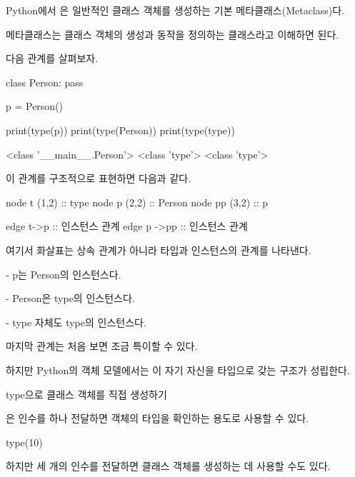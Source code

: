 Python에서 은 일반적인 클래스 객체를 생성하는 기본 메타클래스(Metaclass)다.

메타클래스는 클래스 객체의 생성과 동작을 정의하는 클래스라고 이해하면 된다.

다음 관계를 살펴보자.

\begin{dhkcode}
class Person:
    pass

p = Person()

print(type(p))
print(type(Person))
print(type(type))
\end{dhkcode}

\begin{dhkzsh}
<class '__main__.Person'>
<class 'type'>
<class 'type'>
\end{dhkzsh}

이 관계를 구조적으로 표현하면 다음과 같다.

\begin{dhkdiagram}[in=12]
node t (1,2) :: type
node p (2,2) :: Person
node pp (3,2) :: p

edge t->p :: 인스턴스 관계
edge p ->pp :: 인스턴스 관계
\end{dhkdiagram}

여기서 화살표는 상속 관계가 아니라 타입과 인스턴스의 관계를 나타낸다.

\begin{dhksmry}
    - p는 Person의 인스턴스다.

    - Person은 type의 인스턴스다.

    - type 자체도 type의 인스턴스다.
\end{dhksmry}

마지막 관계는 처음 보면 조금 특이할 수 있다.

하지만 Python의 객체 모델에서는 이 자기 자신을 타입으로 갖는 구조가 성립한다.

\begin{dhknote}
\begin{dhksmry}[centered]
type으로 클래스 객체를 직접 생성하기
\end{dhksmry}
\end{dhknote}

은 인수를 하나 전달하면 객체의 타입을 확인하는 용도로 사용할 수 있다.

\begin{dhkcode}
type(10)
\end{dhkcode}

하지만 세 개의 인수를 전달하면 클래스 객체를 생성하는 데 사용할 수도 있다.


